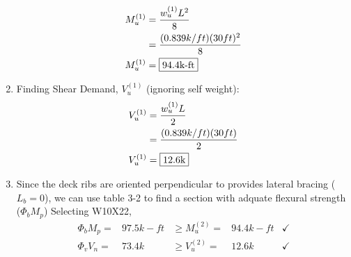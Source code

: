 \documentclass{report} %
\begin{document}
\begin{enumerate}
\begin{equation*}
\begin{aligned}
                M^{(1)}_u   &= \frac{{w^{(1)}_u}L^2}{8} \\
                            &= \frac{(0.839k/ft)(30ft)^2}{8} \\
                M^{(1)}_u   &= \framebox{94.4k-ft}
            \end{aligned}
        \end{equation*}
    \item Finding Shear Demand, $V^{(1)}_u$ (ignoring self weight):
        \begin{equation*}
            \begin{aligned}
                V^{(1)}_u   &= \frac{{w^{(1)}_u}L}{2} \\
                            &= \frac{(0.839k/ft)(30ft)}{2} \\
                V^{(1)}_u   &= \framebox{12.6k}
            \end{aligned}
        \end{equation*}
    \item Since the deck ribs are oriented perpendicular to provides lateral bracing ($L_b = 0$), we can use table 3-2 to find a section with adquate flexural strength ($\Phi _b M_p$) 
        \newline
        Selecting W10X22, 
            \begin{equation*}
                \begin{aligned}
                    \Phi _b M_p = &97.5k-ft &\geq M^{(2)}_u = &94.4k-ft &\checkmark\\
                    \Phi _v V_n = &73.4k &\geq V^{(2)}_u = &12.6k &\checkmark
                \end{aligned}
            \end{equation*}
\end{enumerate}
\end{document}
